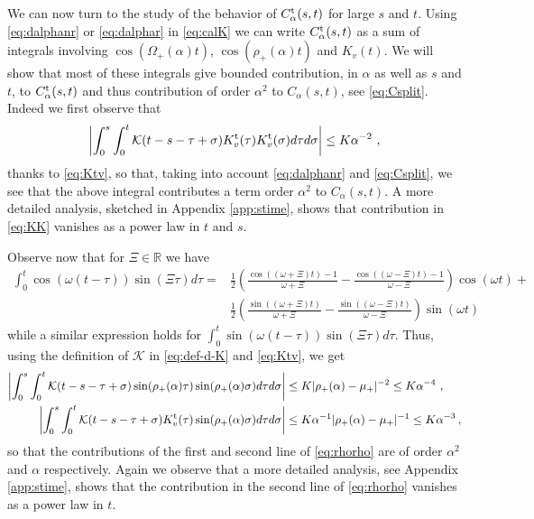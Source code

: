 \documentclass[11pt]{article}
\numberwithin{equation}{section}
\numberwithin{theorem}{section}
\begin{document}
We can now turn to the study of the behavior of $C^{\rm t}_{\alpha}(s,t)$ for large $s$ and $t$. 
Using \eqref{eq:dalphanr} or \eqref{eq:dalphar} in \eqref{eq:calK} we can write $C^{\rm t}_{\alpha}(s,t)$ as a sum of 
integrals involving $\cos(\Omega_+(\alpha)t)$, $\cos(\rho_+(\alpha)t)$ and $K_v(t)$. We will show that most of 
these integrals give bounded contribution, in $\alpha$ as well as $s$ and $t$, to $C^{\rm t}_{\alpha}(s,t)$ and thus 
contribution of order $\alpha^2$ to $C_\alpha(s,t)$, see \eqref{eq:Csplit}. Indeed we first observe that
\begin{equation}\label{eq:KK}
\left|\int_0^s\int_0^t \mathcal K(t-s-\tau+\sigma)K^{\rm t}_v(\tau)K^{\rm t}_v(\sigma)d\tau d\sigma\right|\leq
K\alpha^{-2}\ ,
\end{equation}
thanks to \eqref{eq:Ktv}, so that, taking into account \eqref{eq:dalphanr} and \eqref{eq:Csplit}, we see that the above 
integral contributes a term order $\alpha^2$ to $C_\alpha(s,t)$. A more detailed analysis, sketched in Appendix 
\ref{app:stime}, shows that contribution in
\eqref{eq:KK} vanishes as a power law in $t$ and $s$. 

Observe now that for $\Xi\in\mathds R$ we have
\[
\begin{aligned}
\int_0^t \cos(\omega (t-\tau))\sin(\Xi\tau)d\tau=&\frac 
12\left(\frac{\cos((\omega+\Xi)t)-1}{\omega+\Xi}-\frac{\cos((\omega-\Xi)t)-1}{\omega-\Xi}\right)\cos(\omega t)+\\
&\frac 
12\left(\frac{\sin((\omega+\Xi)t)}{\omega+\Xi}-\frac{\sin((\omega-\Xi)t)}{\omega-\Xi}\right)\sin(\omega t)
\end{aligned}
\]
while a similar expression holds for $\int_0^t \sin(\omega(t- \tau))\sin(\Xi\tau)d\tau$. Thus, using the definition of
$\mathcal K$ in \eqref{eq:def-d-K} and \eqref{eq:Ktv}, we get
\begin{equation}\label{eq:rhorho}
\begin{aligned}
\left|\int_0^s\int_0^t \mathcal K(t-s-\tau+\sigma)\sin(\rho_+(\alpha)\tau)\sin(\rho_+(\alpha)\sigma)d\tau
d\sigma\right|&\leq K|\rho_+(\alpha)-\mu_+|^{-2}\leq K\alpha^{-4}\ ,\\
\left|\int_0^s\int_0^t \mathcal K(t-s-\tau+\sigma)K^{\rm t}_v(\tau)\sin(\rho_+(\alpha)\sigma)d\tau
d\sigma\right|&\leq K\alpha^{-1}|\rho_+(\alpha)-\mu_+|^{-1}\leq K\alpha^{-3}\, ,
\end{aligned}
\end{equation}
so that the contributions of the first and second line of \eqref{eq:rhorho} are of order $\alpha^2$ and $\alpha$ 
respectively.
Again we observe that a more detailed analysis, see Appendix
\ref{app:stime}, shows that the contribution in the second
line of \eqref{eq:rhorho} vanishes as a power law in $t$. 
\end{document}
